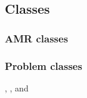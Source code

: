\documentclass[10pt]{article}
\begin{document}
\subsubsection{}

\subsection{Classes} \label{ss:classes}


\subsubsection{AMR classes}



\subsubsection{Problem classes}

, , and 

\end{document}
